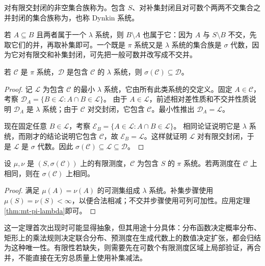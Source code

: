 \documentclass[UTF8,12pt,a4paper,fontset=fandol]{ctexbook}
\begin{document}
\begin{definition}
对有限交封闭的非空集合族称为。包含 $S$、对补集封闭且对可数个两两不交集合之并封闭的集合族称为，也称 Dynkin 系统。
\end{definition}
若 $A\subseteq B$ 且两者属于一个 $\lambda$ 系统，则 $B\setminus A$ 也属于它：因为 $A$ 与 $S\setminus B$ 不交，先取它们的并，再取补集即可。一个既是 $\pi$ 系统又是 $\lambda$ 系统的集合族是 $\sigma$ 代数，因为它对有限交和补集封闭，可先把一般可数并改写成不交并。

\begin{theorem}[$\pi$--$\lambda$ 定理]
若 $\mathcal C$ 是 $\pi$ 系统，$\mathcal D$ 是包含 $\mathcal C$ 的 $\lambda$ 系统，则 $\sigma(\mathcal C)\subseteq\mathcal D$。
\label{thm:mt-pi-lambda}
\end{theorem}
\begin{proof}
记 $\mathcal L$ 为包含 $\mathcal C$ 的最小 $\lambda$ 系统，它由所有此类系统的交定义。固定 $A\in\mathcal C$，考察
$\mathcal D_A=\{B\in\mathcal L:A\cap B\in\mathcal L\}$。
由于 $A\in\mathcal L$，前述相对差性质和不交并性质说明 $\mathcal D_A$ 是 $\lambda$ 系统；由于 $\mathcal C$ 对交封闭，它包含 $\mathcal C$。最小性推出 $\mathcal D_A=\mathcal L$。

现在固定任意 $B\in\mathcal L$，考察
$\mathcal E_B=\{A\in\mathcal L:A\cap B\in\mathcal L\}$。
相同论证说明它是 $\lambda$ 系统，而刚才的结论说明它包含 $\mathcal C$，故 $\mathcal E_B=\mathcal L$。这样就证明 $\mathcal L$ 对有限交封闭，于是 $\mathcal L$ 是 $\sigma$ 代数。因此 $\sigma(\mathcal C)\subseteq\mathcal L\subseteq\mathcal D$。
\end{proof}

\begin{corollary}[有限测度的唯一性]
设 $\mu,\nu$ 是 $(S,\sigma(\mathcal C))$ 上的有限测度，$\mathcal C$ 为包含 $S$ 的 $\pi$ 系统。若两测度在 $\mathcal C$ 上相同，则在 $\sigma(\mathcal C)$ 上相同。
\label{cor:mt-finite-uniqueness}
\end{corollary}
\begin{proof}
满足 $\mu(A)=\nu(A)$ 的可测集组成 $\lambda$ 系统。补集步骤使用 $\mu(S)=\nu(S)<\infty$，以便合法相减；不交并步骤使用可列可加性。应用定理\ref{thm:mt-pi-lambda}即可。
\end{proof}
这一定理首次出现时可能显得抽象，但其用途十分具体：分布函数决定概率分布、矩形上的乘法规则决定联合分布、预测度在生成代数上的数值决定扩张，都会归结为这种唯一性。有限性若缺失，则需要先在可数个有限测度区域上局部验证，再合并，不能直接在无穷总质量上使用补集减法。
\end{document}
